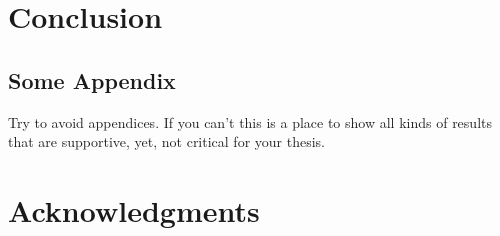 \documentclass[a4paper,11pt,twoside]{pads-thesis}
\begin{document}
\chapter{Conclusion} \label{chap:conclusion}


 

\begin{appendices}
    \chapter{Some Appendix}
    Try to avoid appendices.
    If you can't this is a place to show all kinds of results that are supportive, yet, not critical for your thesis.
\end{appendices}



\chapter*{Acknowledgments}

\end{document}
